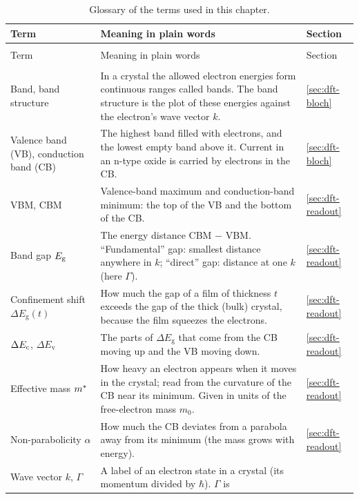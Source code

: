 \begin{small}
\begin{longtable}{@{}>{\raggedright\arraybackslash}p{3.3cm}>{\raggedright\arraybackslash}p{9.0cm}>{\raggedright\arraybackslash}p{1.6cm}@{}}
\caption{Glossary of the terms used in this chapter.}\label{tab:dft-glossary}\\
\toprule
Term & Meaning in plain words & Section \\
\midrule
\endfirsthead
\multicolumn{3}{@{}l}{\textit{\Cref{tab:dft-glossary}, continued}}\\
\toprule
Term & Meaning in plain words & Section \\
\midrule
\endhead
\bottomrule
\endfoot
\multicolumn{3}{@{}l}{\textit{Physics of electrons in solids}}\\
Band, band structure & In a crystal the allowed electron energies form continuous ranges called bands. The band
structure is the plot of these energies against the electron's wave vector $k$. & \ref{sec:dft-bloch} \\
Valence band (VB), conduction band (CB) & The highest band filled with electrons, and the lowest empty band above it.
Current in an n-type oxide is carried by electrons in the CB. & \ref{sec:dft-bloch} \\
VBM, CBM & Valence-band maximum and conduction-band minimum: the top of the VB and the bottom of the CB. & \ref{sec:dft-readout} \\
Band gap $E_{\mathrm{g}}$ & The energy distance CBM $-$ VBM. ``Fundamental'' gap: smallest distance anywhere in $k$;
``direct'' gap: distance at one $k$ (here $\Gamma$). & \ref{sec:dft-readout} \\
Confinement shift $\Delta E_{\mathrm{g}}(t)$ & How much the gap of a film of thickness $t$ exceeds the gap of the thick
(bulk) crystal, because the film squeezes the electrons. & \ref{sec:dft-readout} \\
$\Delta E_{\mathrm{c}}$, $\Delta E_{\mathrm{v}}$ & The parts of $\Delta E_{\mathrm{g}}$ that come from the CB moving up and the VB moving
down. & \ref{sec:dft-readout} \\
Effective mass $m^{*}$ & How heavy an electron appears when it moves in the crystal; read from the curvature of the
CB near its minimum. Given in units of the free-electron mass $m_0$. & \ref{sec:dft-readout} \\
Non-parabolicity $\alpha$ & How much the CB deviates from a parabola away from its minimum (the mass grows with energy). & \ref{sec:dft-readout} \\
Wave vector $k$, $\Gamma$ & A label of an electron state in a crystal (its momentum divided by $\hbar$). $\Gamma$ is

\end{longtable}
\end{small}
